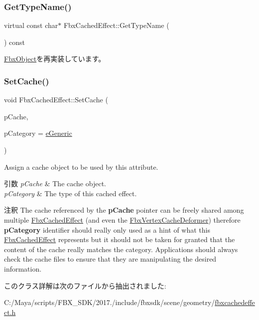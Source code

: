 \subsubsection{\texorpdfstring{Get\+Type\+Name()}{GetTypeName()}}
{\footnotesize\ttfamily virtual const char$\ast$ Fbx\+Cached\+Effect\+::\+Get\+Type\+Name (\begin{DoxyParamCaption}{ }\end{DoxyParamCaption}) const\hspace{0.3cm}{\ttfamily [virtual]}}



\hyperlink{class_fbx_object_a817dcfa8f7f7e2437324e1e71377c4b2}{Fbx\+Object}を再実装しています。

\mbox{\label{class_fbx_cached_effect_a4b31ce36a13bc43e6bfad32c6d9b7f7a}} 
\subsubsection{\texorpdfstring{Set\+Cache()}{SetCache()}}
{\footnotesize\ttfamily void Fbx\+Cached\+Effect\+::\+Set\+Cache (\begin{DoxyParamCaption}\item[{\hyperlink{class_fbx_cache}{Fbx\+Cache} $\ast$}]{p\+Cache,  }\item[{\hyperlink{class_fbx_cached_effect_ab402402f3e66d6e31eb3002b0bd58c33}{E\+Category}}]{p\+Category = {\ttfamily \hyperlink{class_fbx_cached_effect_ab402402f3e66d6e31eb3002b0bd58c33a301e356a3faecf6bea31b2ab220b3cf8}{e\+Generic}} }\end{DoxyParamCaption})}

Assign a cache object to be used by this attribute. 
\begin{DoxyParams}{引数}
{\em p\+Cache} & The cache object. \\
\hline
{\em p\+Category} & The type of this cached effect. \\
\hline
\end{DoxyParams}
\begin{DoxyRemark}{注釈}
The cache referenced by the {\bfseries p\+Cache} pointer can be freely shared among multiple \hyperlink{class_fbx_cached_effect}{Fbx\+Cached\+Effect} (and even the \hyperlink{class_fbx_vertex_cache_deformer}{Fbx\+Vertex\+Cache\+Deformer}) therefore {\bfseries p\+Category} identifier should really only used as a hint of what this \hyperlink{class_fbx_cached_effect}{Fbx\+Cached\+Effect} represents but it should not be taken for granted that the content of the cache really matches the category. Applications should always check the cache files to ensure that they are manipulating the desired information. 
\end{DoxyRemark}


このクラス詳解は次のファイルから抽出されました\+:\begin{DoxyCompactItemize}
\item 
C\+:/\+Maya/scripts/\+F\+B\+X\+\_\+\+S\+D\+K/2017./include/fbxsdk/scene/geometry/\hyperlink{fbxcachedeffect_8h}{fbxcachedeffect.\+h}\end{DoxyCompactItemize}
